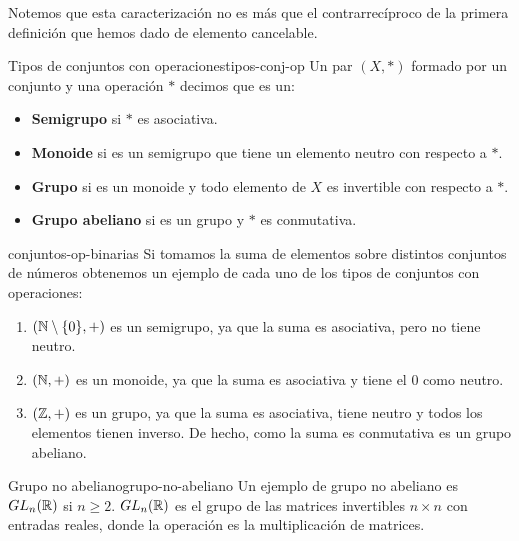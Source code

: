 \begin{remark}
    Notemos que esta caracterización no es más que el contrarrecíproco de la primera definición que hemos dado de elemento cancelable. 
\end{remark}

\begin{definition}{Tipos de conjuntos con operaciones}{tipos-conj-op}
    Un par \((X,*)\) formado por un conjunto y una operación \(*\) decimos que es un:
    \begin{itemize}
        \item \textbf{Semigrupo} si \(*\) es asociativa.
        
        \item \textbf{Monoide} si es un semigrupo que tiene un elemento neutro con respecto a \(*\).
        
        \item \textbf{Grupo} si es un monoide y todo elemento de \(X\) es invertible con respecto a \(*\).
        
        \item \textbf{Grupo abeliano} si es un grupo y \(*\) es conmutativa.
    \end{itemize}
\end{definition}

\begin{example}{}{conjuntos-op-binarias}
    Si tomamos la suma de elementos sobre distintos conjuntos de números obtenemos un ejemplo de cada uno de los tipos de conjuntos con operaciones:
    \begin{enumerate}
        \item $(\mathbb{N} \setminus \{ 0 \},+)$ es un semigrupo, ya que la suma es asociativa, pero no tiene neutro.
        \item $(\mathbb{N},+)$ es un monoide, ya que la suma es asociativa y tiene el 0 como neutro.
        \item $(\mathbb{Z},+)$ es un grupo, ya que la suma es asociativa, tiene neutro y todos los elementos tienen inverso. De hecho, como la suma es conmutativa es un grupo abeliano.
    \end{enumerate}
\end{example}

\begin{example}{Grupo no abeliano}{grupo-no-abeliano}
    Un ejemplo de grupo no abeliano es $GL_n(\mathbb{R})$ si $n \geq 2$. $GL_n(\mathbb{R})$ es el grupo de las matrices invertibles $n\times n$ con entradas reales, donde la operación es la multiplicación de matrices.
\end{example}

